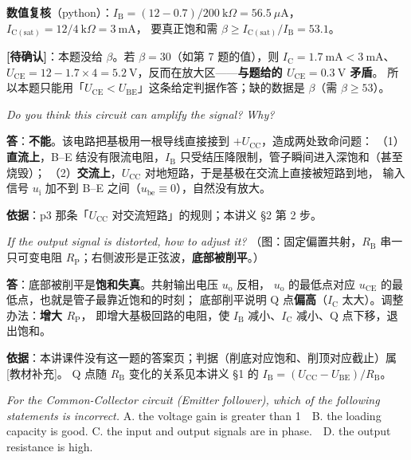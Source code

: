 \documentclass[11pt]{ctexart}
\begin{document}
\textbf{数值复核}（python）：$I_{\mathrm{B}}=(12-0.7)/200\ \mathrm{k}\Omega=56.5\ \mu\mathrm{A}$，
$I_{\mathrm{C(sat)}}=12/4\ \mathrm{k}\Omega=3\ \mathrm{mA}$，
要真正饱和需 $\beta\ge I_{\mathrm{C(sat)}}/I_{\mathrm{B}}=53.1$。

\textbf{[待确认]}：本题没给 $\beta$。若 $\beta=30$（如第 7 题的值），则 $I_{\mathrm{C}}=1.7\ \mathrm{mA}<3\ \mathrm{mA}$、
$U_{\mathrm{CE}}=12-1.7\times4=5.2\ \mathrm{V}$，反而在放大区——\textbf{与题给的 $U_{\mathrm{CE}}=0.3\ \mathrm{V}$ 矛盾}。
所以本题只能用「$U_{\mathrm{CE}}<U_{\mathrm{BE}}$」这条给定判据作答；缺的数据是 $\beta$（需 $\beta\ge53$）。


\textit{Do you think this circuit can amplify the signal? Why?}

\textbf{答}：\textbf{不能}。该电路把基极用一根导线直接接到 $+U_{\mathrm{CC}}$，造成两处致命问题：
（1）\textbf{直流上}，B--E 结没有限流电阻，$I_{\mathrm{B}}$ 只受结压降限制，管子瞬间进入深饱和（甚至烧毁）；
（2）\textbf{交流上}，$U_{\mathrm{CC}}$ 对地短路，于是基极在交流上直接被短路到地，
输入信号 $u_{\mathrm{i}}$ 加不到 B--E 之间（$u_{\mathrm{be}}\equiv0$），自然没有放大。

\textbf{依据}：p3 那条「$U_{\mathrm{CC}}$ 对交流短路」的规则；本讲义 §2 第 2 步。


\textit{If the output signal is distorted, how to adjust it?}
（图：固定偏置共射，$R_{\mathrm{B}}$ 串一只可变电阻 $R_{\mathrm{P}}$；右侧波形是正弦波，\textbf{底部被削平}。）

\textbf{答}：底部被削平是\textbf{饱和失真}。共射输出电压 $u_{\mathrm{o}}$ 反相，
$u_{\mathrm{o}}$ 的最低点对应 $u_{\mathrm{CE}}$ 的最低点，也就是管子最靠近饱和的时刻；
底部削平说明 Q 点\textbf{偏高}（$I_{\mathrm{C}}$ 太大）。调整办法：\textbf{增大 $R_{\mathrm{P}}$}，
即增大基极回路的电阻，使 $I_{\mathrm{B}}$ 减小、$I_{\mathrm{C}}$ 减小、Q 点下移，退出饱和。

\textbf{依据}：本讲课件没有这一题的答案页；判据（削底对应饱和、削顶对应截止）属 [教材补充]。
Q 点随 $R_{\mathrm{B}}$ 变化的关系见本讲义 §1 的 $I_{\mathrm{B}}=(U_{\mathrm{CC}}-U_{\mathrm{BE}})/R_{\mathrm{B}}$。


\textit{For the Common-Collector circuit (Emitter follower), which of the following statements is incorrect.}
A. the voltage gain is greater than 1　B. the loading capacity is good.
C. the input and output signals are in phase.　D. the output resistance is high.
\end{document}
